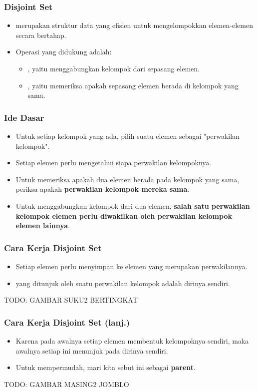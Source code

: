 \begin{frame}
\frametitle{Disjoint Set}
\begin{itemize}
  \item \pDjs merupakan struktur data yang efisien untuk mengelompokkan elemen-elemen secara bertahap.
  \item Operasi yang didukung adalah:
  \begin{itemize}
    \item {}, yaitu menggabungkan kelompok dari sepasang elemen.
    \item {}, yaitu memeriksa apakah sepasang elemen berada di kelompok yang sama.
  \end{itemize}
\end{itemize}
\end{frame}

\begin{frame}
\frametitle{Ide Dasar}
\begin{itemize}
  \item Untuk setiap kelompok yang ada, pilih suatu elemen sebagai "perwakilan kelompok".
  \item Setiap elemen perlu mengetahui siapa perwakilan kelompoknya.
  \item Untuk memeriksa apakah dua elemen berada pada kelompok yang sama, periksa apakah \textbf{perwakilan kelompok mereka sama}.
  \item Untuk menggabungkan kelompok dari dua elemen, \textbf{salah satu perwakilan kelompok elemen perlu diwakilkan oleh perwakilan kelompok elemen lainnya}.
\end{itemize}
\end{frame}

\begin{frame}
\frametitle{Cara Kerja Disjoint Set}
\begin{itemize}
  \item Setiap elemen perlu menyimpan  ke elemen yang merupakan perwakilannya.
  \item {} yang ditunjuk oleh suatu perwakilan kelompok adalah dirinya sendiri.
\end{itemize}
TODO: GAMBAR SUKU2 BERTINGKAT
\end{frame}

\begin{frame}
\frametitle{Cara Kerja Disjoint Set (lanj.)}
\begin{itemize}
  \item Karena pada awalnya setiap elemen membentuk kelompoknya sendiri, maka awalnya setiap  ini menunjuk pada dirinya sendiri.
  \item Untuk mempermudah, mari kita sebut  ini sebagai \textbf{parent}.
\end{itemize}
TODO: GAMBAR MASING2 JOMBLO
\end{frame}

